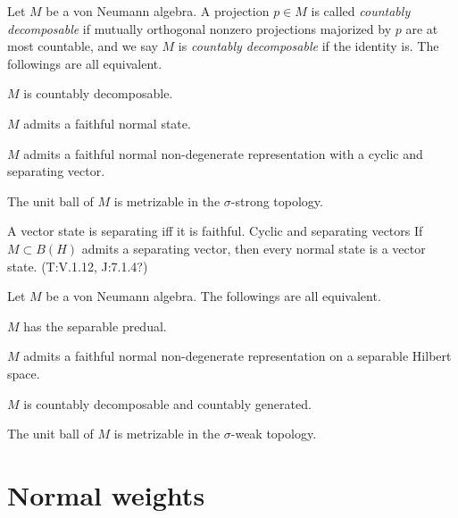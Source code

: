 \documentclass{../../large}
\begin{document}
\begin{prb}
Let $M$ be a von Neumann algebra.
A projection $p\in M$ is called \emph{countably decomposable} if mutually orthogonal nonzero projections majorized by $p$ are at most countable, and we say $M$ is \emph{countably decomposable} if the identity is.
The followings are all equivalent.
\begin{parts}
\item $M$ is countably decomposable.
\item $M$ admits a faithful normal state.
\item $M$ admits a faithful normal non-degenerate representation with a cyclic and separating vector.
\item The unit ball of $M$ is metrizable in the $\sigma$-strong topology.
\end{parts}
\end{prb}
\begin{pf}
\end{pf}

\begin{prb}
A vector state is separating iff it is faithful.
Cyclic and separating vectors
If $M\subset B(H)$ admits a separating vector, then every normal state is a vector state. (T:V.1.12, J:7.1.4?)
\end{prb}



\begin{prb}
Let $M$ be a von Neumann algebra.
The followings are all equivalent.
\begin{parts}
\item $M$ has the separable predual.
\item $M$ admits a faithful normal non-degenerate representation on a separable Hilbert space.
\item $M$ is countably decomposable and countably generated.
\item The unit ball of $M$ is metrizable in the $\sigma$-weak topology.
\end{parts}
\end{prb}
\begin{pf}
\end{pf}



\section{Normal weights}
\end{document}
